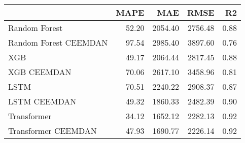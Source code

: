 \begin{tabular}{lrrrr}
\toprule
{} &  MAPE &     MAE &    RMSE &   R2 \\
\midrule
Random Forest         & 52.20 & 2054.40 & 2756.48 & 0.88 \\
Random Forest CEEMDAN & 97.54 & 2985.40 & 3897.60 & 0.76 \\
XGB                   & 49.17 & 2064.44 & 2817.45 & 0.88 \\
XGB CEEMDAN           & 70.06 & 2617.10 & 3458.96 & 0.81 \\
LSTM                  & 70.51 & 2240.22 & 2908.37 & 0.87 \\
LSTM CEEMDAN          & 49.32 & 1860.33 & 2482.39 & 0.90 \\
Transformer           & 34.12 & 1652.12 & 2282.13 & 0.92 \\
Transformer CEEMDAN   & 47.93 & 1690.77 & 2226.14 & 0.92 \\
\bottomrule
\end{tabular}
